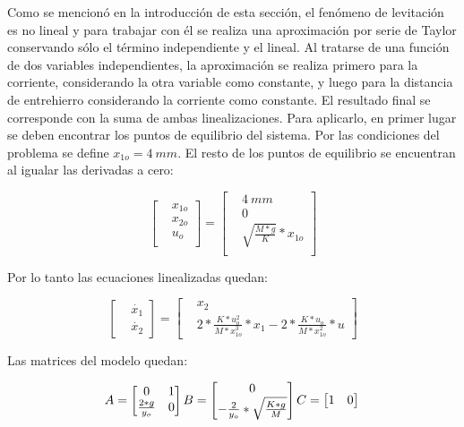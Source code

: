 Como se mencionó en la introducción de esta sección, el fenómeno de levitación es no lineal y para trabajar con él se realiza una aproximación por serie de Taylor conservando sólo el término independiente y el lineal. Al tratarse de una función de dos variables independientes, la aproximación se realiza primero para la corriente, considerando la otra variable como constante, y luego para la distancia de entrehierro considerando la corriente como constante. El resultado final se corresponde con la suma de ambas linealizaciones.
Para aplicarlo, en primer lugar se deben encontrar los puntos de equilibrio del sistema. Por las condiciones del problema se define $x_{1o}=4\:mm$. El resto de los puntos de equilibrio se encuentran al igualar las derivadas a cero:

\begin{equation*}
\begin{bmatrix}
		&x_{1o}\\
		&x_{2o}\\
		&u_{o}\\
\end{bmatrix}
=
\begin{bmatrix}
	&4\:mm\\
	&0\\
	&\sqrt{\frac{M*g}{K}}*x_{1o}\\
\end{bmatrix}
\end{equation*}

\noindent Por lo tanto las ecuaciones linealizadas quedan:

\begin{equation*} 
	\begin{bmatrix}
		&\dot{x_{1}}\\
		&\dot{x_{2}}
	\end{bmatrix}
	=
	\begin{bmatrix}
		&x_{2}\\
		&2*\frac{K*u_{o}^{2}}{M*x_{1o}^{3}}*x_{1}-2*\frac{K*u_{o}}{M*x_{1o}^{2}}*u
	\end{bmatrix}
\end{equation*}

\noindent Las matrices del modelo quedan:

\begin{equation*}
	A=
	\begin{bmatrix}
		0 & 1\\
		\frac{2*g}{y_{o}} & 0
	\end{bmatrix}\\
	  B=
	\begin{bmatrix}
	0\\
	-\frac{2}{y_{o}}*\sqrt{\frac{K*g}{M}}
	\end{bmatrix}\\
	  C=
	\begin{bmatrix}
	1 & 0\\
	\end{bmatrix}\\
\end{equation*}



